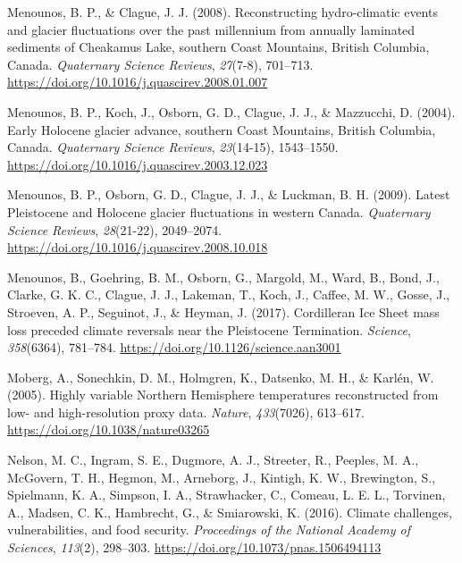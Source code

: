 \documentclass[
  letterpaper,
  DIV=11,
  numbers=noendperiod]{scrartcl}
\newlength{\cslhangindent}
\newlength{\cslentryspacingunit} %
\newenvironment{CSLReferences}[2] %
 {%
  \setlength{\parindent}{0pt}
  \ifodd #1
  \let\oldpar\par
  \def\par{\hangindent=\cslhangindent\oldpar}
  \fi
  \setlength{\parskip}{#2\cslentryspacingunit}
 }%
 {}
\begin{document}
\begin{CSLReferences}{1}{0}
\leavevmode{}%
Menounos, B. P., \& Clague, J. J. (2008). {Reconstructing hydro-climatic
events and glacier fluctuations over the past millennium from annually
laminated sediments of Cheakamus Lake, southern Coast Mountains, British
Columbia, Canada}. \emph{Quaternary Science Reviews}, \emph{27}(7-8),
701--713. \url{https://doi.org/10.1016/j.quascirev.2008.01.007}

\leavevmode{}%
Menounos, B. P., Koch, J., Osborn, G. D., Clague, J. J., \& Mazzucchi,
D. (2004). {Early Holocene glacier advance, southern Coast Mountains,
British Columbia, Canada}. \emph{Quaternary Science Reviews},
\emph{23}(14-15), 1543--1550.
\url{https://doi.org/10.1016/j.quascirev.2003.12.023}

\leavevmode{}%
Menounos, B. P., Osborn, G. D., Clague, J. J., \& Luckman, B. H. (2009).
{Latest Pleistocene and Holocene glacier fluctuations in western
Canada}. \emph{Quaternary Science Reviews}, \emph{28}(21-22),
2049--2074. \url{https://doi.org/10.1016/j.quascirev.2008.10.018}

\leavevmode{}%
Menounos, B., Goehring, B. M., Osborn, G., Margold, M., Ward, B., Bond,
J., Clarke, G. K. C., Clague, J. J., Lakeman, T., Koch, J., Caffee, M.
W., Gosse, J., Stroeven, A. P., Seguinot, J., \& Heyman, J. (2017).
{Cordilleran Ice Sheet mass loss preceded climate reversals near the
Pleistocene Termination}. \emph{Science}, \emph{358}(6364), 781--784.
\url{https://doi.org/10.1126/science.aan3001}

\leavevmode{}%
Moberg, A., Sonechkin, D. M., Holmgren, K., Datsenko, M. H., \& Karlén,
W. (2005). {Highly variable Northern Hemisphere temperatures
reconstructed from low- and high-resolution proxy data}. \emph{Nature},
\emph{433}(7026), 613--617. \url{https://doi.org/10.1038/nature03265}

\leavevmode{}%
Nelson, M. C., Ingram, S. E., Dugmore, A. J., Streeter, R., Peeples, M.
A., McGovern, T. H., Hegmon, M., Arneborg, J., Kintigh, K. W.,
Brewington, S., Spielmann, K. A., Simpson, I. A., Strawhacker, C.,
Comeau, L. E. L., Torvinen, A., Madsen, C. K., Hambrecht, G., \&
Smiarowski, K. (2016). {Climate challenges, vulnerabilities, and food
security}. \emph{Proceedings of the National Academy of Sciences},
\emph{113}(2), 298--303. \url{https://doi.org/10.1073/pnas.1506494113}


\end{CSLReferences}
\end{document}
